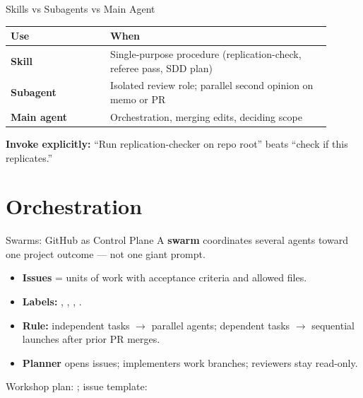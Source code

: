 \begin{frame}{Skills vs Subagents vs Main Agent}
  \begin{center}
    \begin{tabular}{@{}p{0.28\linewidth}p{0.62\linewidth}@{}}
      \toprule
      \textbf{Use} & \textbf{When} \\
      \midrule
      \textbf{Skill} & \textnormal{Single-purpose procedure (replication-check, referee pass, SDD plan)} \\
      \textbf{Subagent} & \textnormal{Isolated review role; parallel second opinion on memo or PR} \\
      \textbf{Main agent} & \textnormal{Orchestration, merging edits, deciding scope} \\
      \bottomrule
    \end{tabular}
  \end{center}
  \vspace{0.4em}
  \textbf{Invoke explicitly:} \textnormal{``Run replication-checker on repo root'' beats ``check if this replicates.''}
\end{frame}

\section{Orchestration}

\begin{frame}{Swarms: GitHub as Control Plane}
  A \textbf{swarm} coordinates several agents toward one project outcome --- not one giant prompt.
  \vspace{0.3em}
  \begin{itemize}
    \item \textbf{Issues} = units of work with acceptance criteria and allowed files.
    \item \textbf{Labels:} , , , .
    \item \textbf{Rule:} independent tasks $\to$ parallel agents; dependent tasks $\to$ sequential launches after prior PR merges.
    \item \textbf{Planner} opens issues; implementers work branches; reviewers stay read-only.
  \end{itemize}
  \vspace{0.3em}
  {\small Workshop plan: ; issue template: }
\end{frame}


